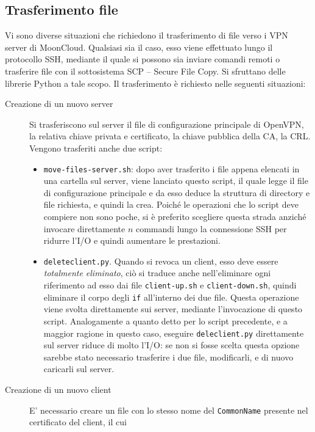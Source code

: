\subsection{Trasferimento file}
Vi sono diverse situazioni che richiedono il trasferimento di file
verso i VPN server di MoonCloud. Qualsiasi sia il caso, esso viene effettuato
lungo il protocollo SSH, mediante il quale si possono sia inviare comandi remoti
o trasferire file con il sottosistema SCP -- Secure File Copy. Si sfruttano
delle librerie Python a tale scopo.
Il trasferimento è richiesto nelle seguenti situazioni:
\begin{description}
	\item[Creazione di un nuovo server]Si trasferiscono sul server il file
	di configurazione principale di OpenVPN, la relativa chiave privata e certificato,
	la chiave pubblica della CA, la CRL.
	Vengono trasferiti anche due script:
	\begin{itemize}
		\item \texttt{move-files-server.sh}: dopo aver trasferito i file appena elencati
		      in una cartella sul server, viene lanciato questo script, il quale legge il file
		      di configurazione principale e da esso deduce la struttura di directory e file
		      richiesta, e quindi la crea.
		      Poiché le operazioni che lo script deve compiere non sono poche, si è
		      preferito scegliere questa strada anziché invocare direttamente $n$ commandi 
		      lungo la connessione SSH per ridurre l'I/O e quindi aumentare le prestazioni.
		\item \texttt{deleteclient.py}. Quando si revoca un client, esso deve essere
		      \textit{totalmente eliminato}, ciò si traduce anche nell'eliminare ogni riferimento
		      ad esso dai file \texttt{client-up.sh} e \texttt{client-down.sh}, quindi eliminare
		      il corpo degli \texttt{if} all'interno dei due file. Questa operazione viene
		      svolta direttamente sui server, mediante l'invocazione di questo script.
		      Analogamente a quanto detto per lo script precedente, e a maggior ragione in questo
		      caso, eseguire \texttt{deleclient.py} direttamente sul server riduce di molto l'I/O:
		      se non si fosse scelta questa opzione sarebbe stato necessario trasferire i due file,
		      modificarli, e di nuovo caricarli sul server.
	\end{itemize}
	\item[Creazione di un nuovo client]E' necessario creare un file con lo stesso
	nome del \texttt{CommonName} presente nel certificato del client, il cui

\end{description}
